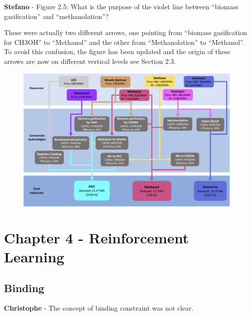 \documentclass[12pt,a4paper]{article}
\begin{document}
\noindent 

\begin{mdframed}[style=manuscript] %

\end{mdframed}

\begin{mdframed}[style=comment] %
{\color{orange} \textbf{Stefano}} - Figure 2.5: What is the purpose of the violet line between ``biomass gasification'' and ``methanolation''?
\end{mdframed}

\noindent These were actually two different arrows, one pointing from ``biomass gasification for CH3OH'' to ``Methanol'' and the other from ``Methanolation'' to ``Methanol''. To avoid this confusion, the figure has been updated and the origin of these arrows are now on different vertical levels {\color{blue} see Section 2.3}.

\begin{figure}[htbp!]
\centering
\includegraphics[width=\textwidth]{NED_tech.pdf}
\label{fig:NED_tech}
\end{figure}


\section{Chapter 4 - Reinforcement Learning}
\label{Chap_RL}


\subsection{Binding}
\label{RL_binding}

\begin{mdframed}[style=comment] %
{\color{violet} \textbf{Christophe}} - The concept of binding constraint was not clear.
\end{mdframed}
\end{document}
